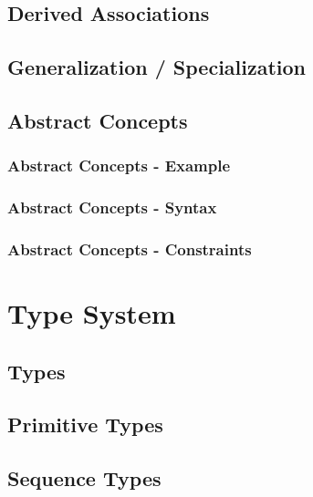 \documentclass[a4paper,oneside,12pt, extrafontsizes]{memoir}
\theoremstyle{definition}
\theoremstyle{definition}
\theoremstyle{definition}
\theoremstyle{definition}
\begin{document}
\chapter{Derived Associations}
\label{ch:derived-associations}

\chapter{Generalization / Specialization}
\label{ch:generalization}


\chapter{Abstract Concepts}
\label{ch:abstract}


\section{Abstract Concepts - Example}


\section{Abstract Concepts - Syntax}


\section{Abstract Concepts - Constraints}


\part{Type System}

\chapter{Types}

\chapter{Primitive Types}
\label{ch:primitive-types}


\chapter{Sequence Types}
\label{ch:sequence-types}
\end{document}
